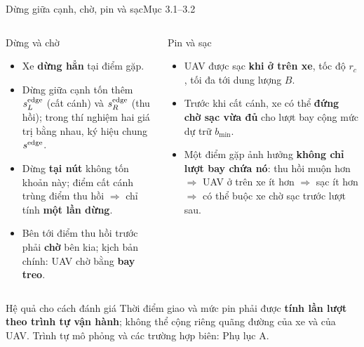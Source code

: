 \documentclass[aspectratio=169,10pt,t,xcolor={table}]{beamer}
\newcommand{\src}[1]{\hfill{\normalfont\footnotesize\color{white!62!navy}#1}}  %
\begin{document}
\begin{frame}{Dừng giữa cạnh, chờ, pin và sạc\src{Mục 3.1--3.2}}
\begin{columns}[T,onlytextwidth]
\begin{block}{Dừng và chờ}
\footnotesize
\begin{itemize}
\item Xe \textbf{dừng hẳn} tại điểm gặp.
\item Dừng giữa cạnh tốn thêm $s^{\rm edge}_L$ (cất cánh) và $s^{\rm edge}_R$ (thu hồi); trong thí nghiệm hai giá trị bằng nhau, ký hiệu chung $s^{\rm edge}$.
\item Dừng \textbf{tại nút} không tốn khoản này; điểm cất cánh trùng điểm thu hồi $\Rightarrow$ chỉ tính \textbf{một lần dừng}.
\item Bên tới điểm thu hồi trước phải \textbf{chờ} bên kia; kịch bản chính: UAV chờ bằng \textbf{bay treo}.
\end{itemize}
\end{block}
\begin{block}{Pin và sạc}
\footnotesize
\begin{itemize}
\item UAV được sạc \textbf{khi ở trên xe}, tốc độ $r_c$, tối đa tới dung lượng $B$.
\item Trước khi cất cánh, xe có thể \textbf{đứng chờ sạc vừa đủ} cho lượt bay cộng mức dự trữ $b_{\min}$.
\item Một điểm gặp ảnh hưởng \textbf{không chỉ lượt bay chứa nó}: thu hồi muộn hơn $\Rightarrow$ UAV ở trên xe ít hơn $\Rightarrow$ sạc ít hơn $\Rightarrow$ có thể buộc xe chờ sạc trước lượt sau.
\end{itemize}
\end{block}
\end{columns}
\vspace{4pt}
\begin{alertblock}{Hệ quả cho cách đánh giá}
\footnotesize Thời điểm giao và mức pin phải được \textbf{tính lần lượt theo trình tự vận hành}; không thể cộng riêng quãng đường của xe và của UAV.
Trình tự mô phỏng và các trường hợp biên: Phụ lục A.
\end{alertblock}
\end{frame}
\end{document}
